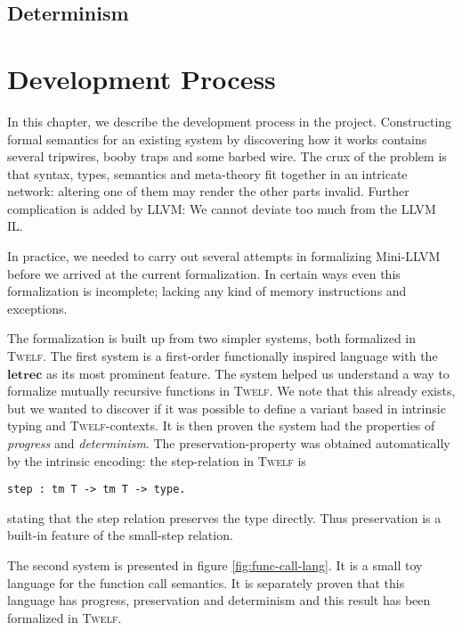 \documentclass[a4paper, oneside, 10pt, draft]{memoir}
\newcommand{\twelf}{\textsc{Twelf}}
\begin{document}
\section{Determinism}
\chapter{Development Process}

In this chapter, we describe the development process in the
project. Constructing formal semantics for an existing system by
discovering how it works contains several tripwires, booby traps and
some barbed wire. The crux of the problem is that syntax, types,
semantics and meta-theory fit together in an intricate network:
altering one of them may render the other parts invalid. Further
complication is added by LLVM: We cannot deviate too much from the
LLVM IL.

In practice, we needed to carry out several attempts in formalizing
Mini-LLVM before we arrived at the current formalization. In certain
ways even this formalization is incomplete; lacking any kind of memory
instructions and exceptions.

The formalization is built up from two simpler systems, both
formalized in \twelf{}. The first system is a first-order
functionally inspired language with the $\mathbf{letrec}$ as its most
prominent feature. The system helped us understand a way to formalize
mutually recursive functions in \twelf{}. We note that this already
exists\cite{twelfwiki:2007}, but we wanted to discover if it was
possible to define a variant based in intrinsic typing and
\twelf{}-contexts. It is then proven the system had the properties of
\emph{progress} and \emph{determinism}. The preservation-property was
obtained automatically by the intrinsic encoding: the step-relation in
\twelf{} is
\begin{verbatim}
step : tm T -> tm T -> type.
\end{verbatim}
stating that the step relation preserves the type directly. Thus
preservation is a built-in feature of the small-step relation.

The second system is presented in figure \ref{fig:func-call-lang}. It
is a small toy language for the function call semantics. It is
separately proven that this language has progress, preservation and
determinism and this result has been formalized in \twelf{}.
\end{document}
